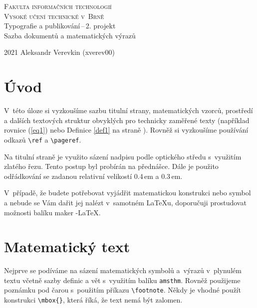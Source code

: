 \documentclass[a4paper, 11pt, twocolumn]{article}
\theoremstyle{definition}
\theoremstyle{plain}
\begin{document}
\begin{titlepage}

\begin{center}
\Huge
\textsc{Fakulta informačních technologií\\
Vysoké učení technické v~Brně}\\
{\LARGE
Typografie a publikování\,–\,2. projekt\\
Sazba dokumentů a matematických výrazů\\}
\end{center}
{\Large 2021 \hfill
Aleksandr Verevkin (xverev00)}

\end{titlepage}

\section*{Úvod}

V~této úloze si vyzkoušíme sazbu titulní strany, matematic\-kých vzorců, prostředí a dalších textových struktur obvyklých pro technicky zaměřené texty (například rovnice (\ref{eq1})
nebo Definice \ref{def1} na straně \pageref{def1}). Rovněž si vyzkoušíme používání odkazů \verb|\ref| a \verb|\pageref|.

Na titulní straně je využito sázení nadpisu podle optického středu s~využitím zlatého řezu. Tento postup byl probírán na přednášce. Dále je použito odřádkování se
zadanou relativní velikostí 0.4\,em a 0.3\,em.

V~případě, že budete potřebovat vyjádřit matematickou
konstrukci nebo symbol a nebude se Vám dařit jej nalézt
v~samotném \LaTeX u, doporučuji prostudovat možnosti balíku maker \AmS-\LaTeX.

\section{Matematický text}

Nejprve se podíváme na sázení matematických symbolů
a~výrazů v~plynulém textu včetně sazby definic a vět s~využitím balíku \verb|amsthm|. Rovněž použijeme poznámku pod čarou s~použitím příkazu \verb|\footnote|. Někdy je vhodné
použít konstrukci \verb|\mbox{}|, která říká, že text nemá být
zalomen.
\end{document}
